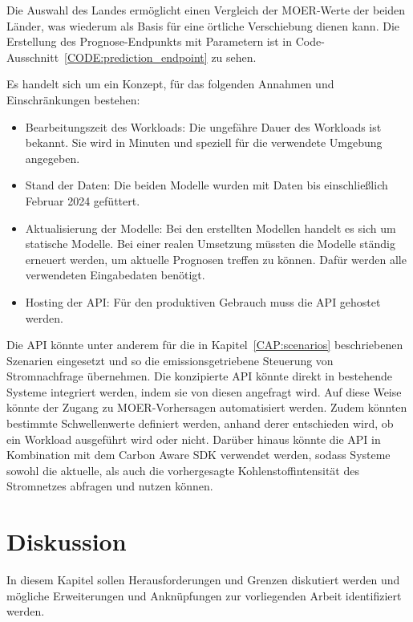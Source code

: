 Die Auswahl des Landes ermöglicht einen Vergleich der \ac{MOER}-Werte der beiden Länder, was wiederum als Basis für eine örtliche Verschiebung dienen kann.
Die Erstellung des Prognose-Endpunkts mit Parametern ist in Code-Ausschnitt~\ref{CODE:prediction_endpoint} zu sehen.


\noindent Es handelt sich um ein Konzept, für das folgenden Annahmen und Einschränkungen bestehen:
\begin{itemize}
 \item Bearbeitungszeit des Workloads: Die ungefähre Dauer des Workloads ist bekannt.
 Sie wird in Minuten und speziell für die verwendete Umgebung angegeben.
 \item Stand der Daten: Die beiden Modelle wurden mit Daten bis einschließlich Februar 2024 gefüttert.
 \item Aktualisierung der Modelle: Bei den erstellten Modellen handelt es sich um statische Modelle.
 Bei einer realen Umsetzung müssten die Modelle ständig erneuert werden, um aktuelle Prognosen treffen zu können.
 Dafür werden alle verwendeten Eingabedaten benötigt.
 \item Hosting der \ac{API}: Für den produktiven Gebrauch muss die \ac{API} gehostet werden.
\end{itemize}

\noindent Die \ac{API} könnte unter anderem für die in Kapitel~\ref{CAP:scenarios} beschriebenen Szenarien eingesetzt und so die emissionsgetriebene Steuerung von Stromnachfrage übernehmen.
Die konzipierte \ac{API} könnte direkt in bestehende Systeme integriert werden, indem sie von diesen angefragt wird.
Auf diese Weise könnte der Zugang zu \ac{MOER}-Vorhersagen automatisiert werden.
Zudem könnten bestimmte Schwellenwerte definiert werden, anhand derer entschieden wird, ob ein Workload ausgeführt wird oder nicht.
Darüber hinaus könnte die \ac{API} in Kombination mit dem Carbon Aware \ac{SDK} verwendet werden, sodass Systeme sowohl die aktuelle, als auch die vorhergesagte Kohlenstoffintensität des Stromnetzes abfragen und nutzen können.


\chapter{Diskussion}\label{CAP:discussion}
\noindent In diesem Kapitel sollen Herausforderungen und Grenzen diskutiert werden und mögliche Erweiterungen und Anknüpfungen zur vorliegenden Arbeit identifiziert werden.

